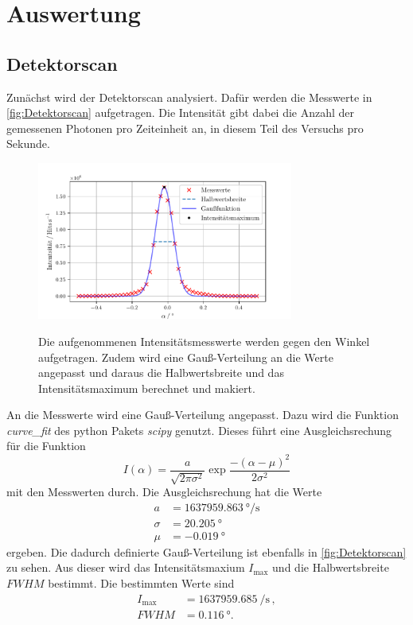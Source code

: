 \section{Auswertung}
\label{sec:Auswertung}

\subsection{Detektorscan}
Zunächst wird der Detektorscan analysiert. 
Dafür werden die Messwerte in \autoref{fig:Detektorscan} aufgetragen.
Die Intensität gibt dabei die Anzahl der gemessenen Photonen pro Zeiteinheit an, in diesem Teil des Versuchs pro Sekunde.
\begin{figure}
    \centering
    \caption{Die aufgenommenen Intensitätsmesswerte werden gegen den Winkel aufgetragen. Zudem wird eine Gauß-Verteilung an die Werte angepasst und daraus die Halbwertsbreite und das Intensitätsmaximum berechnet und makiert.}
    \includegraphics[width=0.75\textwidth]{content/data/Detectorscan.pdf}
    \label{fig:Detektorscan}
\end{figure}
An die Messwerte wird eine Gauß-Verteilung angepasst.
Dazu wird die Funktion \textit{curve\_fit} des python Pakets \textit{scipy} \cite{scipy} genutzt.
Dieses führt eine Ausgleichsrechung für die Funktion 
\begin{equation*}
    I(\alpha) = \frac{a}{\sqrt{2\pi\sigma^2}} \exp{\frac{-\left (\alpha- \mu \right)^2}{2\sigma^2}}
\end{equation*}
mit den Messwerten durch.
Die Ausgleichsrechung hat die Werte 
\begin{align*}
    a &= \SI{1637959.863}{\degree / \second}\\
    \sigma &= \SI{20.205}{\degree} \\
    \mu &= \SI{-0.019}{\degree}
\end{align*}
ergeben.
Die dadurch definierte Gauß-Verteilung ist ebenfalls in \autoref{fig:Detektorscan} zu sehen.
Aus dieser wird das Intensitätsmaxium $I_\text{max}$ und die Halbwertsbreite $FWHM$ bestimmt.
Die bestimmten Werte sind
\begin{align*}
    I_\text{max} &= \SI{1637959.685}{\per \second} \, , \\
    FWHM &= \SI{0.116}{\degree}.
\end{align*}
\FloatBarrier

